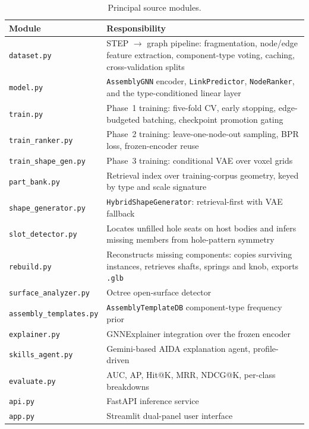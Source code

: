 \documentclass[12pt,oneside,a4paper]{report}
\begin{document}
\begin{table}[h]
\centering
\caption{Principal source modules.}
\label{tab:modules}
\small
\begin{tabularx}{\textwidth}{@{}L{4.1cm}X@{}}
\toprule
\textbf{Module} & \textbf{Responsibility} \\
\midrule
\texttt{dataset.py} & STEP $\to$ graph pipeline: fragmentation, node/edge feature extraction, component-type voting, caching, cross-validation splits \\
\texttt{model.py} & \texttt{AssemblyGNN} encoder, \texttt{LinkPredictor}, \texttt{NodeRanker}, and the type-conditioned linear layer \\
\texttt{train.py} & Phase~1 training: five-fold CV, early stopping, edge-budgeted batching, checkpoint promotion gating \\
\texttt{train\_ranker.py} & Phase~2 training: leave-one-node-out sampling, BPR loss, frozen-encoder reuse \\
\texttt{train\_shape\_gen.py} & Phase~3 training: conditional VAE over voxel grids \\
\texttt{part\_bank.py} & Retrieval index over training-corpus geometry, keyed by type and scale signature \\
\texttt{shape\_generator.py} & \texttt{HybridShapeGenerator}: retrieval-first with VAE fallback \\
\texttt{slot\_detector.py} & Locates unfilled hole seats on host bodies and infers missing members from hole-pattern symmetry \\
\texttt{rebuild.py} & Reconstructs missing components: copies surviving instances, retrieves shafts, springs and knob, exports \texttt{.glb} \\
\texttt{surface\_analyzer.py} & Octree open-surface detector \\
\texttt{assembly\_templates.py} & \texttt{AssemblyTemplateDB} component-type frequency prior \\
\texttt{explainer.py} & GNNExplainer integration over the frozen encoder \\
\texttt{skills\_agent.py} & Gemini-based AIDA explanation agent, profile-driven \\
\texttt{evaluate.py} & AUC, AP, Hit@K, MRR, NDCG@K, per-class breakdowns \\
\texttt{api.py} & FastAPI inference service \\
\texttt{app.py} & Streamlit dual-panel user interface \\
\bottomrule
\end{tabularx}
\end{table}
\end{document}

